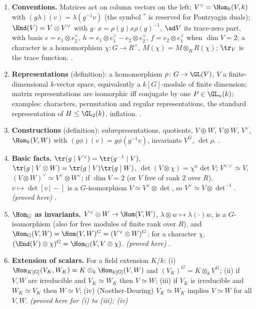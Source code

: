 \begin{enumerate}[label=\textbf{\thechapter.\arabic*}]
\item \textbf{Conventions.} Matrices act on column vectors on the left; $V^\vee=\Hom_k(V,k)$ with $(g\lambda)(v)=\lambda(g^{-1}v)$ (the
symbol ${}^*$ is reserved for Pontryagin duals); $\End(V)=V\otimes V^\vee$ with $g\cdot x=\rho(g)x\rho(g)^{-1}$, $\ad V$ its trace-zero
part, with basis $e=e_1\otimes e_2^\vee$, $h=e_1\otimes e_1^\vee-e_2\otimes e_2^\vee$, $f=e_2\otimes e_1^\vee$ when $\dim V=2$; a character is a
homomorphism $\chi\colon G\to R^\times$, $M(\chi)=M\otimes_RR(\chi)$; $\tr_V$ is the trace function. .
\item \textbf{Representations} (definition): a homomorphism $\rho\colon G\to\GL(V)$, $V$ a finite-dimensional $k$-vector space, equivalently
a $k[G]$-module of finite dimension; matrix representations are isomorphic iff conjugate by one $P\in\GL_n(k)$; examples: characters,
permutation and regular representations, the standard representation of $H\le\GL_2(k)$, inflation. .
\item \textbf{Constructions} (definition): subrepresentations, quotients, $V\oplus W$, $V\otimes W$, $V^\vee$, $\Hom_k(V,W)$ with
$(g\phi)(v)=g\phi(g^{-1}v)$, invariants $V^G$, $\det\rho$. .
\item \textbf{Basic facts.} $\tr(g\mid V^\vee)=\tr(g^{-1}\mid V)$, $\tr(g\mid V\otimes W)=\tr(g\mid V)\tr(g\mid W)$, $\det(V\otimes\chi)=\chi^n\det V$;
$V^{\vee\vee}\simeq V$, $(V\otimes W)^\vee\simeq V^\vee\otimes W^\vee$; if $\dim V=2$ (or $V$ free of rank $2$ over $R$), $v\mapsto\det[v\,|\,{-}]$ is a
$G$-isomorphism $V\simeq V^\vee\otimes\det$, so $V^\vee\simeq V\otimes\det^{-1}$. \emph{(proved here)} .
\item \textbf{$\Hom_G$ as invariants.} $V^\vee\otimes W\to\Hom(V,W)$, $\lambda\otimes w\mapsto\lambda(\cdot)w$, is a $G$-isomorphism (also for free
modules of finite rank over $R$), and $\Hom_G(V,W)=\Hom(V,W)^G=(V^\vee\otimes W)^G$; for a character $\chi$,
$(\End(V)\otimes\chi)^G=\Hom_G(V,V\otimes\chi)$. \emph{(proved here)} .
\item \textbf{Extension of scalars.} For a field extension $K/k$: (i) $\Hom_{K[G]}(V_K,W_K)=K\otimes_k\Hom_{k[G]}(V,W)$ and
$(V_K)^G=K\otimes_kV^G$; (ii) if $V,W$ are irreducible and $V_K\simeq W_K$ then $V\simeq W$; (iii) if $V_K$ is irreducible and $W_K\simeq V_K$
then $W\simeq V$; (iv) (Noether-Deuring) $V_K\simeq W_K$ implies $V\simeq W$ for all $V,W$. \emph{(proved here for (i) to (iii); (iv)
}
\end{enumerate}
